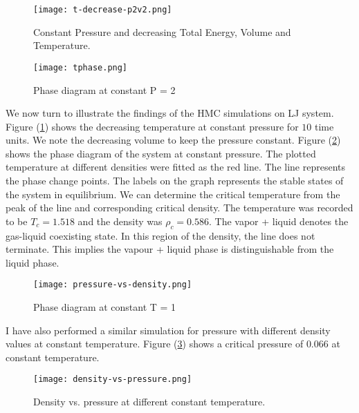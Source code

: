\documentclass[aps,prl,reprint]{revtex4-1}
\begin{document}
\begin{figure}
	\texttt{[image: t-decrease-p2v2.png]}
	\caption{Constant Pressure and decreasing Total Energy, Volume and Temperature.} \label{tempdecr}
\end{figure}

\begin{figure}
	\texttt{[image: tphase.png]}
	\caption{Phase diagram at constant P = 2} \label{tphase}
\end{figure}

We now turn to illustrate the findings of the HMC simulations on LJ system. Figure (\ref{tempdecr}) shows the decreasing temperature at constant pressure for $10$ time units. We note the decreasing volume to keep the pressure constant. Figure (\ref{tphase}) shows the phase diagram of the system at constant pressure. The plotted temperature at different densities were fitted as the red line. The line represents the phase change points. The labels on the graph represents the stable states of the system in equilibrium. We can determine the critical temperature from the peak of the line and corresponding critical density. The temperature was recorded to be $T_c = 1.518$ and the density was $\rho_c = 0.586$. The vapor + liquid denotes the gas-liquid coexisting state. In this region of the density, the line does not terminate. This implies the vapour + liquid phase is distinguishable from the liquid phase. 

\begin{figure}
	\texttt{[image: pressure-vs-density.png]}
	\caption{Phase diagram at constant T = 1} \label{pphase}
\end{figure}

I have also performed a similar simulation for pressure with different density values at constant temperature. Figure (\ref{pphase}) shows a critical pressure of $0.066$ at constant temperature.



\begin{figure}
	\texttt{[image: density-vs-pressure.png]}
	\caption{Density vs. pressure at different constant temperature.} \label{dvsp}
\end{figure}
\end{document}
